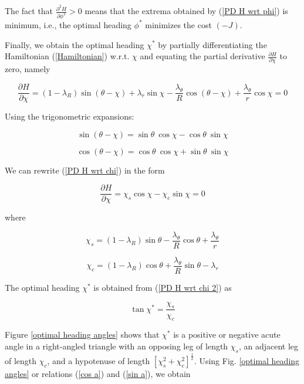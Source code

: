 The fact that $\frac{\partial^2 H}{\partial \phi^2}>0$ means that the extrema obtained by (\ref{PD H wrt phi}) is minimum, i.e., the optimal heading $\phi^*$ minimizes the cost $(-J)$.

Finally, we obtain the optimal heading $\chi^*$ by partially differentiating the Hamiltonian (\ref{Hamiltonian}) w.r.t. $\chi$ and equating the partial derivative $\frac{\partial H}{\partial \chi}$ to zero, namely

\begin{equation}
	\frac{\partial H}{\partial \chi} = (1-\lambda_R) \sin(\theta - \chi) + \lambda_r \sin \chi 
	- \frac{\lambda_\theta}{R} \cos (\theta - \chi) + \frac{\lambda_\theta}{r} \cos \chi = 0
\label{PD H wrt chi}
\end{equation}

Using the trigonometric expansions: 

\begin{equation}
	\sin(\theta - \chi) = \sin \theta\ \cos\chi - \cos \theta\ \sin\chi 
\end{equation}

\begin{equation}
\cos(\theta - \chi) = \cos \theta\ \cos\chi + \sin \theta\ \sin\chi 
\end{equation}

We can rewrite (\ref{PD H wrt chi}) in the form 

\begin{equation}
		\frac{\partial H}{\partial \chi} = \chi_s \cos\chi - \chi_c \sin \chi =0
\label{PD H wrt chi 2}
\end{equation}

where 

\begin{equation}
	\chi_s = (1-\lambda_R) \sin\theta - \frac{\lambda_\theta}{R} \cos\theta + \frac{\lambda_\theta}{r}
\end{equation}

\begin{equation}
	\chi_c = (1-\lambda_R) \cos \theta + \frac{\lambda_\theta}{R} \sin \theta - \lambda_r
\end{equation}


The optimal heading $\chi^*$ is obtained from (\ref{PD H wrt chi 2}) as  

\begin{equation}
	\tan \chi^* = \dfrac{\chi_s}{\chi_c}
\label{tan chi}
\end{equation}

Figure \ref{optimal heading angles} shows that $\chi^*$ is a positive or negative acute angle in a right-angled triangle with an opposing leg of length $\chi_s$, an adjacent leg of length $\chi_c$, and a hypotenuse of length $[\chi^2_s+ \chi^2_c]^\frac{1}{2}$. Using Fig. \ref{optimal heading angles} or relations (\ref{cos a}) and (\ref{sin a}), we obtain 



